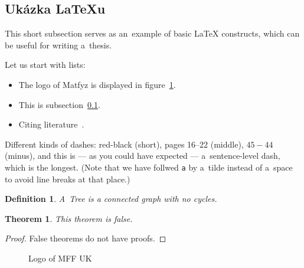 
\subsection{Ukázka \LaTeX{}u}
\label{ssec:ukazka}

This short subsection serves as an~example of basic \LaTeX{} constructs,
which can be useful for writing a~thesis.

Let us start with lists:

\begin{itemize}
\item The logo of Matfyz is displayed in figure~\ref{fig:mff}.
\item This is subsection~\ref{ssec:ukazka}.
\item Citing literature~\cite{lamport94}.
\end{itemize}

Different kinds of dashes:
red-black (short),
pages 16--22 (middle),
$45-44$ (minus),
and this is --- as you could have expected --- a~sentence-level dash,
which is the longest.
(Note that we have follwed \verb|a| by a~tilde instead of a~space
to avoid line breaks at that place.)

\newtheorem{theorem}{Theorem}
\newtheorem*{define}{Definition}	%

\begin{define}
A~{\sl Tree} is a connected graph with no cycles.
\end{define}

\begin{theorem}
This theorem is false.
\end{theorem}

\begin{proof}
False theorems do not have proofs.
\end{proof}

\begin{figure}
	\centering
	\caption{Logo of MFF UK}
	\label{fig:mff}
\end{figure}

